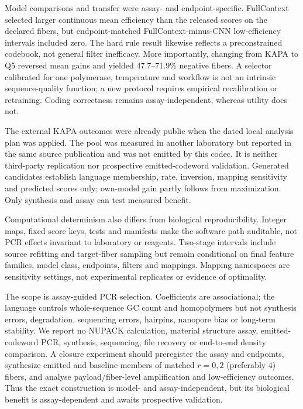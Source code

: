 \documentclass[unnumsec,webpdf,modern,large]{oup-authoring-template}
\begin{document}
Model comparisons and transfer were assay- and endpoint-specific. FullContext selected larger continuous mean efficiency than the released scores on the declared fibers, but endpoint-matched FullContext-minus-CNN low-efficiency intervals included zero. The hard rule result likewise reflects a preconstrained codebook, not general filter inefficacy. More importantly, changing from KAPA to Q5 reversed mean gains and yielded 47.7--71.9\% negative fibers. A selector calibrated for one polymerase, temperature and workflow is not an intrinsic sequence-quality function; a new protocol requires empirical recalibration or retraining. Coding correctness remains assay-independent, whereas utility does not.

The external KAPA outcomes were already public when the dated local analysis plan was applied. The pool was measured in another laboratory but reported in the same source publication and was not emitted by this codec. It is neither third-party replication nor prospective emitted-codeword validation. Generated candidates establish language membership, rate, inversion, mapping sensitivity and predicted scores only; own-model gain partly follows from maximization. Only synthesis and assay can test measured benefit.

Computational determinism also differs from biological reproducibility. Integer maps, fixed score keys, tests and manifests make the software path auditable, not PCR effects invariant to laboratory or reagents. Two-stage intervals include source refitting and target-fiber sampling but remain conditional on final feature families, model class, endpoints, filters and mappings. Mapping namespaces are sensitivity settings, not experimental replicates or evidence of optimality.

The scope is assay-guided PCR selection. Coefficients are associational; the language controls whole-sequence GC count and homopolymers but not synthesis errors, degradation, sequencing errors, hairpins, nanopore bias or long-term stability. We report no NUPACK calculation, material structure assay, emitted-codeword PCR, synthesis, sequencing, file recovery or end-to-end density comparison. A closure experiment should preregister the assay and endpoints, synthesize emitted and baseline members of matched $r=0,2$ (preferably $4$) fibers, and analyse payload/fiber-level amplification and low-efficiency outcomes. Thus the exact construction is model- and assay-independent, but its biological benefit is assay-dependent and awaits prospective validation.
\end{document}
